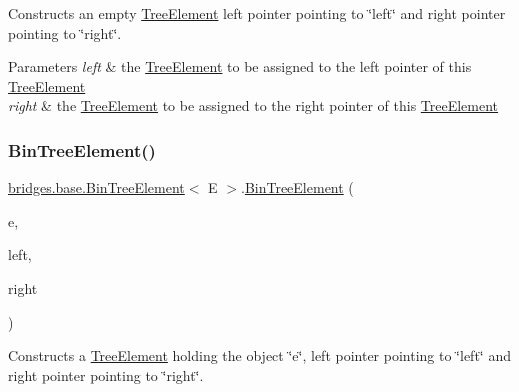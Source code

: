 Constructs an empty \mbox{\hyperlink{classbridges_1_1base_1_1_tree_element}{Tree\+Element}} left pointer pointing to \char`\"{}left\char`\"{} and right pointer pointing to \char`\"{}right\char`\"{}.


\begin{DoxyParams}{Parameters}
{\em left} & the \mbox{\hyperlink{classbridges_1_1base_1_1_tree_element}{Tree\+Element}} to be assigned to the left pointer of this \mbox{\hyperlink{classbridges_1_1base_1_1_tree_element}{Tree\+Element}} \\
\hline
{\em right} & the \mbox{\hyperlink{classbridges_1_1base_1_1_tree_element}{Tree\+Element}} to be assigned to the right pointer of this \mbox{\hyperlink{classbridges_1_1base_1_1_tree_element}{Tree\+Element}} \\
\hline
\end{DoxyParams}
\mbox{\label{classbridges_1_1base_1_1_bin_tree_element_a37f3def3cdf4a9eccf577d0ff3c704e9}} 
\subsubsection{\texorpdfstring{Bin\+Tree\+Element()}{BinTreeElement()}\hspace{0.1cm}{\footnotesize\ttfamily [5/5]}}
{\footnotesize\ttfamily \mbox{\hyperlink{classbridges_1_1base_1_1_bin_tree_element}{bridges.\+base.\+Bin\+Tree\+Element}}$<$ E $>$.\mbox{\hyperlink{classbridges_1_1base_1_1_bin_tree_element}{Bin\+Tree\+Element}} (\begin{DoxyParamCaption}\item[{E}]{e,  }\item[{\mbox{\hyperlink{classbridges_1_1base_1_1_bin_tree_element}{Bin\+Tree\+Element}}$<$ E $>$}]{left,  }\item[{\mbox{\hyperlink{classbridges_1_1base_1_1_bin_tree_element}{Bin\+Tree\+Element}}$<$ E $>$}]{right }\end{DoxyParamCaption})}

Constructs a \mbox{\hyperlink{classbridges_1_1base_1_1_tree_element}{Tree\+Element}} holding the object \char`\"{}e\char`\"{}, left pointer pointing to \char`\"{}left\char`\"{} and right pointer pointing to \char`\"{}right\char`\"{}.



